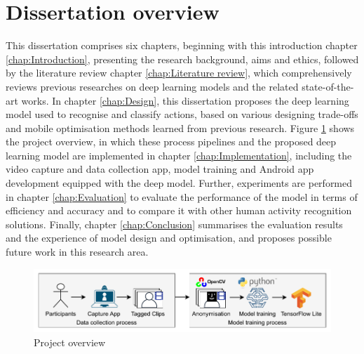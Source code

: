 \section{Dissertation overview}
\label{sec:Dissertation overview}
This dissertation comprises six chapters, beginning with this introduction chapter \ref{chap:Introduction}, presenting the research background, aims and ethics, followed by the literature review chapter \ref{chap:Literature review}, which comprehensively reviews previous researches on deep learning models and the related state-of-the-art works.
In chapter \ref{chap:Design}, this dissertation proposes the deep learning model used to recognise and classify actions, based on various designing trade-offs and mobile optimisation methods learned from previous research.
Figure \ref{fig:0-Intro-Overview} shows the project overview, in which these process pipelines and the proposed deep learning model are implemented in chapter \ref{chap:Implementation}, including the video capture and data collection app, model training and Android app development equipped with the deep model.
Further, experiments are performed in chapter \ref{chap:Evaluation} to evaluate the performance of the model in terms of efficiency and accuracy and to compare it with other human activity recognition solutions.
Finally, chapter \ref{chap:Conclusion} summarises the evaluation results and the experience of model design and optimisation, and proposes possible future work in this research area.

\begin{figure}[h]
    \centering
    \hspace*{-.6cm}
    \includegraphics[scale=1.1]{introduction/imgs/0-Intro-Overview.pdf}
    \caption{Project overview}
    \label{fig:0-Intro-Overview}
\end{figure}